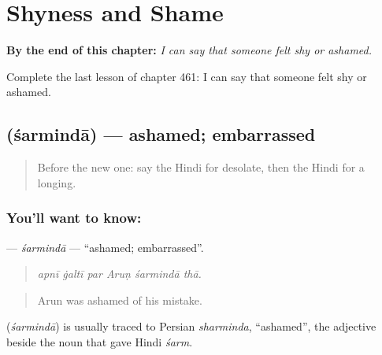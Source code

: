 
\chapter{Shyness and Shame}
\label{ch:hi-shyness-and-shame}

\begin{chapteropening}
\textbf{By the end of this chapter:} \emph{I can say that someone felt shy or ashamed.}

Complete the last lesson of chapter 461: I can say that someone felt shy or ashamed.
\end{chapteropening}

\section[\texorpdfstring{\hi{शर्मिंदा} (śarmindā)}{शर्मिंदा (śarmindā)}]{ (śarmindā) — ashamed; embarrassed}

\label{lesson:HI-C461-sarminda}



\begin{quote}
Before the new one: say the Hindi for desolate, then the Hindi for a longing.
\end{quote}

\subsection*{You'll want to know: }
\textbf{} — \emph{śarmindā} — \textquotedblleft{}ashamed; embarrassed\textquotedblright{}.

\begin{quote}
     
\end{quote}

\begin{quote}
\emph{apnī ġaltī par Aruṇ śarmindā thā.}
\end{quote}

\begin{quote}
Arun was ashamed of his mistake.
\end{quote}

\begin{cousinweb}
\textbf{} (\emph{śarmindā}) is usually traced to Persian \emph{sharminda}, \textquotedblleft{}ashamed\textquotedblright{}, the adjective beside the noun that gave Hindi \emph{śarm}.
\end{cousinweb}

